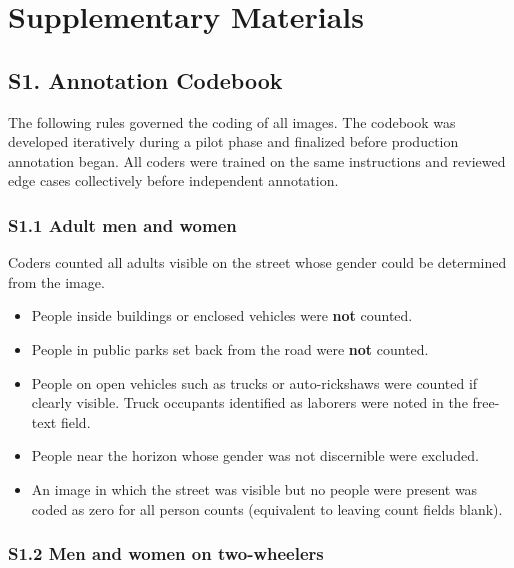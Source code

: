 \documentclass[12pt]{article}
\begin{document}
\section*{Supplementary Materials}

\setcounter{figure}{0}
\renewcommand{\thefigure}{S\arabic{figure}}
\setcounter{table}{0}
\renewcommand{\thetable}{S\arabic{table}}


\subsection*{S1. Annotation Codebook}

The following rules governed the coding of all images. The codebook was developed iteratively during a pilot phase and finalized before production annotation began. All coders were trained on the same instructions and reviewed edge cases collectively before independent annotation.

\subsubsection*{S1.1 Adult men and women}

Coders counted all adults visible on the street whose gender could be determined from the image.

\begin{itemize}[nosep]
\item People inside buildings or enclosed vehicles were \textbf{not} counted.
\item People in public parks set back from the road were \textbf{not} counted.
\item People on open vehicles such as trucks or auto-rickshaws were counted if clearly visible. Truck occupants identified as laborers were noted in the free-text field.
\item People near the horizon whose gender was not discernible were excluded.
\item An image in which the street was visible but no people were present was coded as zero for all person counts (equivalent to leaving count fields blank).
\end{itemize}

\subsubsection*{S1.2 Men and women on two-wheelers}
\end{document}
